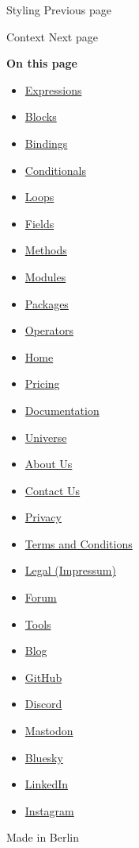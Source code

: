 { Styling } { Previous page }

\href{/docs/reference/context/}{\pandocbounded{}}

{ Context } { Next page }

\textbf{On this page}

\begin{itemize}
\tightlist
\item
  \hyperref[expressions]{Expressions}
\item
  \hyperref[blocks]{Blocks}
\item
  \hyperref[bindings]{Bindings}
\item
  \hyperref[conditionals]{Conditionals}
\item
  \hyperref[loops]{Loops}
\item
  \hyperref[fields]{Fields}
\item
  \hyperref[methods]{Methods}
\item
  \hyperref[modules]{Modules}
\item
  \hyperref[packages]{Packages}
\item
  \hyperref[operators]{Operators}
\end{itemize}

\begin{itemize}
\tightlist
\item
  \href{/}{Home}
\item
  \href{/pricing/}{Pricing}
\item
  \href{/docs/}{Documentation}
\item
  \href{/universe/}{Universe}
\item
  \href{/about/}{About Us}
\item
  \href{/contact/}{Contact Us}
\item
  \href{/privacy/}{Privacy}
\item
  \href{https://typst.app/terms}{Terms and Conditions}
\item
  \href{/legal/}{Legal (Impressum)}
\end{itemize}

\begin{itemize}
\tightlist
\item
  \href{https://forum.typst.app}{Forum}
\item
  \href{/tools/}{Tools}
\item
  \href{/blog/}{Blog}
\item
  \href{https://github.com/typst/}{GitHub}
\item
  \href{https://discord.gg/2uDybryKPe}{Discord}
\item
  \href{https://mastodon.social/@typst}{Mastodon}
\item
  \href{https://bsky.app/profile/typst.app}{Bluesky}
\item
  \href{https://www.linkedin.com/company/typst/}{LinkedIn}
\item
  \href{https://instagram.com/typstapp/}{Instagram}
\end{itemize}

Made in Berlin
